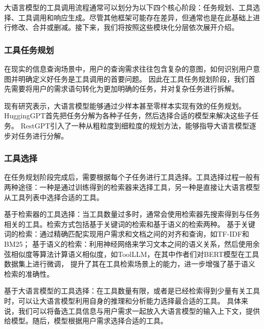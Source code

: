 大语言模型的工具调用流程通常可以划分为以下四个核心阶段\cite{Ruan2023, Shen2023, Song2023}：任务规划、工具选择、工具调用和响应生成。尽管其他框架可能存在差异，但通常也是在此基础上进行修改、合并或删减。接下来，我们将按照这些模块化分层依次展开介绍。

\subsubsection{工具任务规划}

在现实的信息查询场景中，用户的查询需求往往包含复杂的意图，如何识别用户意图并明确定义好任务是工具调用的首要问题。
因此在工具任务规划阶段，我们首先需要将用户的需求语句转化为更加明确的任务，并对复杂任务进行拆解。

现有研究\cite{Miao2023}表示，大语言模型能够通过少样本甚至零样本实现有效的任务规划。
HuggingGPT\cite{Shen2023}首先把任务分解为各种子任务，然后选择合适的模型来解决这些子任务。
RestGPT\cite{Song2023}引入了一种从粗粒度到细粒度的规划方法，能够指导大语言模型逐步对任务进行分解。

\subsubsection{工具选择}

在任务规划阶段完成后，需要根据每个子任务进行工具选择。工具选择过程一般有两种途径：一种是通过训练得到的检索器来选择工具，另一种是直接让大语言模型从工具列表中选择合适的工具。

基于检索器的工具选择：当工具数量过多时，通常会使用检索器先搜索得到与任务相关的工具。检索方式包括基于关键词的检索和基于语义的检索两种。
基于关键词的检索：通过精确匹配实现用户需求和文档之间的对齐和查询，如TF-IDF\cite{Jones1972}和BM25\cite{Robertson2009}；
基于语义的检索：利用神经网络来学习文本之间的语义关系，然后使用余弦相似度等算法计算语义相似度，如ToolLLM\cite{Qin2023}，在其中作者们对BERT模型在工具数据集上进行微调，
提升了其在工具检索场景上的能力，进一步增强了基于语义检索的准确性。

基于大语言模型的工具选择：在工具数量有限，或者是已经检索得到少量有关工具时，可以让大语言模型利用自身的推理和分析能力选择最合适的工具。
具体来说，我们可以将备选工具信息与用户需求一起放入大语言模型的输入上下文，提供给模型。随后，模型根据用户需求选择合适的工具。

